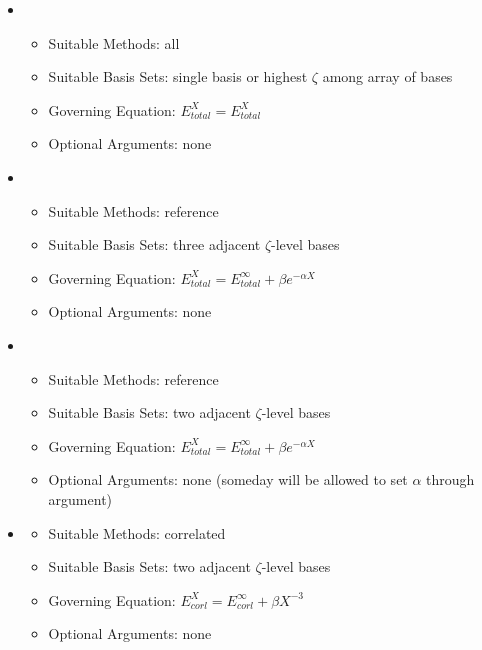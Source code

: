 \begin{itemize}

\item {}

   \begin{itemize}
   \item[] Suitable Methods: all
   \item[] Suitable Basis Sets: single basis or highest $\zeta$ among array of bases
   \item[] Governing Equation: $E_{total}^{X} = E_{total}^{X}$
   \item[] Optional Arguments: none
   \end{itemize}

\item {}

   \begin{itemize}
   \item[] Suitable Methods: reference
   \item[] Suitable Basis Sets: three adjacent $\zeta$-level bases
   \item[] Governing Equation: $E_{total}^{X} = E_{total}^{\infty} + \beta e^{-\alpha X}$
   \item[] Optional Arguments: none
   \end{itemize}

\item {}

   \begin{itemize}
   \item[] Suitable Methods: reference
   \item[] Suitable Basis Sets: two adjacent $\zeta$-level bases
   \item[] Governing Equation: $E_{total}^{X} = E_{total}^{\infty} + \beta e^{-\alpha X}$
   \item[] Optional Arguments: none (someday will be allowed to set $\alpha$ through argument)
   \end{itemize}

\item {}\cite{Halkier:1998:CBS}

   \begin{itemize}
   \item[] Suitable Methods: correlated
   \item[] Suitable Basis Sets: two adjacent $\zeta$-level bases
   \item[] Governing Equation: $E_{corl}^{X} = E_{corl}^{\infty} + \beta X^{-3}$
   \item[] Optional Arguments: none
   \end{itemize}

\end{itemize}

